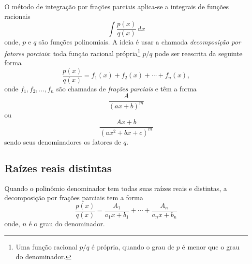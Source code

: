 O método de integração por frações parciais aplica-se a integrais de funções racionais
\begin{equation}
  \int \frac{p(x)}{q(x)}\,dx
\end{equation}
onde, $p$ e $q$ são funções polinomiais. A ideia é usar a chamada \emph{decomposição por fatores parciais}: toda função racional própria\footnote{Uma função racional $p/q$ é própria, quando o grau de $p$ é menor que o grau do denominador.} $p/q$ pode ser reescrita da seguinte forma
\begin{equation}
  \frac{p(x)}{q(x)} = f_1(x) + f_2(x) + \cdots + f_n(x),
\end{equation}
onde $f_1, f_2, \dotsc, f_n$ são chamadas de \emph{frações parciais} e têm a forma
\begin{equation}
  \frac{A}{(ax + b)^m}
\end{equation}
ou
\begin{equation}
  \frac{Ax + b}{(ax^2 + bx + c)^m}
\end{equation}
sendo seus denominadores os fatores de $q$.

\subsection{Raízes reais distintas}

Quando o polinômio denominador tem todas suas raízes reais e distintas, a decomposição por frações parciais tem a forma
\begin{equation}
  \frac{p(x)}{q(x)} = \frac{A_1}{a_1x + b_1} + \cdots + \frac{A_n}{a_nx + b_n} 
\end{equation}
onde, $n$ é o grau do denominador.

